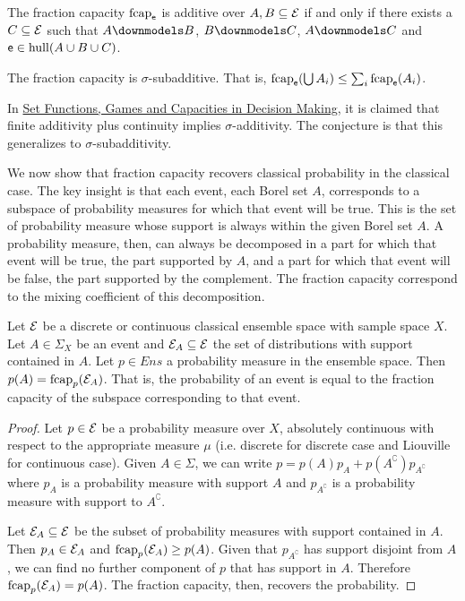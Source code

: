 \begin{conj}
	The fraction capacity $\mathrm{fcap}_{\mathsf{e}}$ is additive over $A, B \subseteq \mathcal{E}$ if and only if there exists a $C \subseteq \mathcal{E}$ such that $A \separate B$, $B \separate C$, $A \separate C$ and $\mathsf{e} \in \mathrm{hull}(A\cup B\cup C)$.
\end{conj}

\begin{conj}
	The fraction capacity is $\sigma$-subadditive. That is, $\mathrm{fcap}_{\mathsf{e}}(\bigcup A_i) \leq \sum_i \mathrm{fcap}_{\mathsf{e}}(A_i)$.
\end{conj}

\begin{remark}
	In \href{https://link.springer.com/book/10.1007/978-3-319-30690-2}{Set Functions, Games and Capacities in Decision Making}, it is claimed that finite additivity plus continuity implies $\sigma$-additivity. The conjecture is that this generalizes to $\sigma$-subadditivity.
\end{remark}

We now show that fraction capacity recovers classical probability in the classical case. The key insight is that each event, each Borel set $A$, corresponds to a subspace of probability measures for which that event will be true. This is the set of probability measure whose support is always within the given Borel set $A$. A probability measure, then, can always be decomposed in a part for which that event will be true, the part supported by $A$, and a part for which that event will be false, the part supported by the complement. The fraction capacity correspond to the mixing coefficient of this decomposition.
\begin{mathSection}
	\begin{prop}
		Let $\mathcal{E}$ be a discrete or continuous classical ensemble space with sample space $X$. Let $A \in \Sigma_X$ be an event and $\mathcal{E}_A \subseteq \mathcal{E}$ the set of distributions with support contained in $A$. Let $p \in Ens$ a probability measure in the ensemble space. Then $p(A) = \mathrm{fcap}_{p}(\mathcal{E}_A)$. That is, the probability of an event is equal to the fraction capacity of the subspace corresponding to that event.
	\end{prop}
	\begin{proof}
		Let $p \in \mathcal{E}$ be a probability measure over $X$, absolutely continuous with respect to the appropriate measure $\mu$ (i.e. discrete for discrete case and Liouville for continuous case). Given $A \in \Sigma$, we can write $p = p(A) p_A + p(A^{\complement}) p_{A^{\complement}}$ where  $p_A$ is a probability measure with support $A$ and $p_{A^{\complement}}$ is a probability measure with support to $A^{\complement}$.
		
		Let $\mathcal{E}_A \subseteq \mathcal{E}$ be the subset of probability measures with support contained in $A$. Then $p_A \in \mathcal{E}_A$ and $\mathrm{fcap}_{p}(\mathcal{E}_A) \geq p(A)$. Given that $p_{A^{\complement}}$ has support disjoint from $A$, we can find no further component of $p$ that has support in $A$. Therefore $\mathrm{fcap}_{p}(\mathcal{E}_A) = p(A)$. The fraction capacity, then, recovers the probability.
	\end{proof}
\end{mathSection}
	
